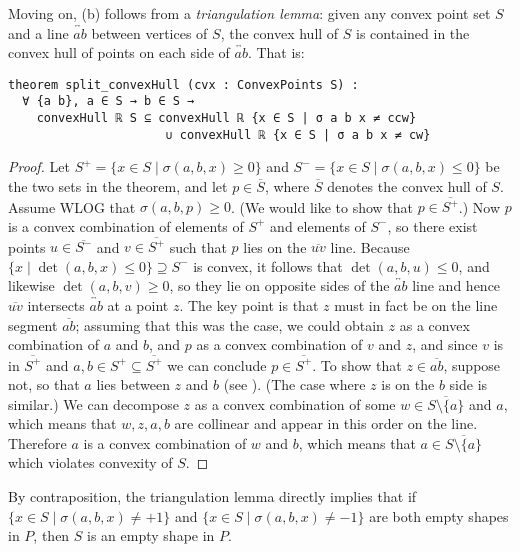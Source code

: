Moving on, (b) follows from a \emph{triangulation lemma}:
given any convex point set $S$
and a line $\overleftrightarrow{ab}$ between vertices of $S$,
the convex hull of $S$ is contained in the convex hull
of points on each side of $\overleftrightarrow{ab}$.
That is:
\begin{lstlisting}
theorem split_convexHull (cvx : ConvexPoints S) :
  ∀ {a b}, a ∈ S → b ∈ S →
    convexHull ℝ S ⊆ convexHull ℝ {x ∈ S | σ a b x ≠ ccw} 
                      ∪ convexHull ℝ {x ∈ S | σ a b x ≠ cw}
\end{lstlisting}

\begin{proof}
    Let $S^+=\{x\in S\mid \sigma(a,b,x)\ge 0\}$ and $S^-=\{x\in S\mid \sigma(a,b,x)\le 0\}$ be the two sets in the theorem, and let $p\in \overline{S}$, where $\overline{S}$ denotes the convex hull of $S$. Assume WLOG that $\sigma(a,b,p)\ge 0$. (We would like to show that $p\in \overline{S^+}$.) Now $p$ is a convex combination of elements of $S^+$ and elements of $S^-$, so there exist points $u\in \overline{S^-}$ and $v\in \overline{S^+}$ such that $p$ lies on the $\overline{uv}$ line.
% 
    Because $\{x\mid \det(a,b,x)\le 0\}\supseteq S^-$ is convex, it follows that $\det(a,b,u)\le 0$, and likewise $\det(a,b,v)\ge 0$, so they lie on opposite sides of the $\overleftrightarrow{ab}$ line and hence $\overline{uv}$ intersects $\overleftrightarrow{ab}$ at a point $z$. The key point is that $z$ must in fact be on the line segment $\overline{ab}$; assuming that this was the case, we could obtain $z$ as a convex combination of $a$ and $b$, and $p$ as a convex combination of $v$ and $z$, and since $v$ is in $\overline{S^+}$ and $a,b\in S^+\subseteq\overline{S^+}$ we can conclude $p\in \overline{S^+}$.
% 
    To show that $z\in \overline{ab}$, suppose not, so that $a$ lies between $z$ and $b$ (see ). (The case where $z$ is on the $b$ side is similar.) We can decompose $z$ as a convex combination of some $w\in \overline{S\setminus\{a\}}$ and $a$, which means that $w,z,a,b$ are collinear and appear in this order on the line. Therefore $a$ is a convex combination of $w$ and $b$, which means that $a\in \overline{S\setminus\{a\}}$ which violates convexity of $S$.
\end{proof}

By contraposition,
the triangulation lemma directly implies that
if $\{x \in S \mid \sigma(a,b,x) \neq +1\}$ and $\{x \in S \mid \sigma(a,b,x) \neq -1\}$
are both empty shapes in $P$,
then $S$ is an empty shape in $P$.


